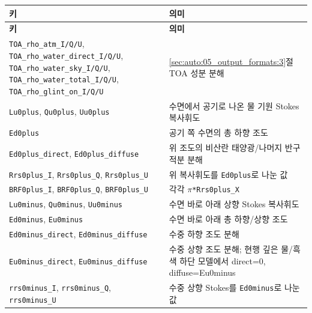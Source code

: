 {\TableFont
\begin{longtable}{@{}>{\raggedright\arraybackslash}p{}>{\raggedright\arraybackslash}p{}@{}}
\toprule
\textbf{키} & \textbf{의미} \\
\midrule
\endfirsthead
\toprule
\textbf{키} & \textbf{의미} \\
\midrule
\endhead
\bottomrule
\endfoot
\texttt{TOA\_\allowbreak{}rho\_\allowbreak{}atm\_\allowbreak{}I/\allowbreak{}Q/\allowbreak{}U}, \texttt{TOA\_\allowbreak{}rho\_\allowbreak{}water\_\allowbreak{}direct\_\allowbreak{}I/\allowbreak{}Q/\allowbreak{}U}, \texttt{TOA\_\allowbreak{}rho\_\allowbreak{}water\_\allowbreak{}sky\_\allowbreak{}I/\allowbreak{}Q/\allowbreak{}U}, \texttt{TOA\_\allowbreak{}rho\_\allowbreak{}water\_\allowbreak{}total\_\allowbreak{}I/\allowbreak{}Q/\allowbreak{}U}, \texttt{TOA\_\allowbreak{}rho\_\allowbreak{}glint\_\allowbreak{}on\_\allowbreak{}I/\allowbreak{}Q/\allowbreak{}U} & \ref{sec:auto:05_output_formats:3}절 TOA 성분 분해 \\
\texttt{Lu0plus}, \texttt{Qu0plus}, \texttt{Uu0plus} & 수면에서 공기로 나온 물 기원 Stokes 복사휘도 \\
\texttt{Ed0plus} & 공기 쪽 수면의 총 하향 조도 \\
\texttt{Ed0plus\_\allowbreak{}direct}, \texttt{Ed0plus\_\allowbreak{}diffuse} & 위 조도의 비산란 태양광/나머지 반구 적분 분해 \\
\texttt{Rrs0plus\_\allowbreak{}I}, \texttt{Rrs0plus\_\allowbreak{}Q}, \texttt{Rrs0plus\_\allowbreak{}U} & 위 복사휘도를 \texttt{Ed0plus}로 나눈 값 \\
\texttt{BRF0plus\_\allowbreak{}I}, \texttt{BRF0plus\_\allowbreak{}Q}, \texttt{BRF0plus\_\allowbreak{}U} & 각각 \texttt{\ensuremath{\pi}*Rrs0plus\_\allowbreak{}X} \\
\texttt{Lu0minus}, \texttt{Qu0minus}, \texttt{Uu0minus} & 수면 바로 아래 상향 Stokes 복사휘도 \\
\texttt{Ed0minus}, \texttt{Eu0minus} & 수면 바로 아래 총 하향/상향 조도 \\
\texttt{Ed0minus\_\allowbreak{}direct}, \texttt{Ed0minus\_\allowbreak{}diffuse} & 수중 하향 조도 분해 \\
\texttt{Eu0minus\_\allowbreak{}direct}, \texttt{Eu0minus\_\allowbreak{}diffuse} & 수중 상향 조도 분해; 현행 깊은 물/흑색 하단 모델에서 direct=0, diffuse=Eu0minus \\
\texttt{rrs0minus\_\allowbreak{}I}, \texttt{rrs0minus\_\allowbreak{}Q}, \texttt{rrs0minus\_\allowbreak{}U} & 수중 상향 Stokes를 \texttt{Ed0minus}로 나눈 값 \\

\end{longtable}}

